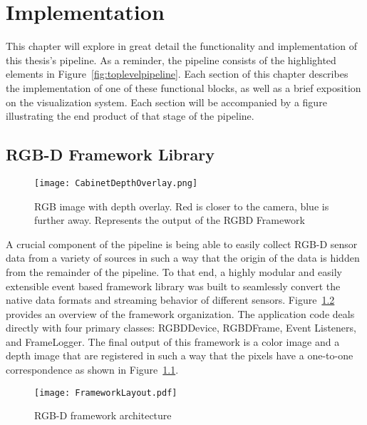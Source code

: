 \chapter{Implementation}
\label{chap:implementation}
This chapter will explore in great detail the functionality and implementation of this thesis's pipeline. As a reminder, the pipeline consists of the highlighted elements in Figure~\ref{fig:toplevelpipeline}. Each section of this chapter describes the implementation of one of these functional blocks, as well as a brief exposition on the visualization system. Each section will be accompanied by a figure illustrating the end product of that stage of the pipeline.

\section{RGB-D Framework Library}
\begin{figure}[ht]
    \centering
    \texttt{[image: CabinetDepthOverlay.png]}
    \caption{RGB image with depth overlay. Red is closer to the camera, blue is further away. Represents the output of the RGBD Framework}
    \label{fig:rgbdframeworkoutput}
\end{figure}
A crucial component of the pipeline is being able to easily collect RGB-D sensor data from a variety of sources in such a way that the origin of the data is hidden from the remainder of the pipeline. To that end, a highly modular and easily extensible event based framework library was built to seamlessly convert the native data formats and streaming behavior of different sensors. Figure~\ref{fig:rgbdframework} provides an overview of the framework organization. The application code deals directly with four primary classes: RGBDDevice, RGBDFrame, Event Listeners, and FrameLogger. The final output of this framework is a color image and a depth image that are registered in such a way that the pixels have a one-to-one correspondence as shown in Figure~\ref{fig:rgbdframeworkoutput}.
\begin{figure}[ht]
    \centering
    \texttt{[image: FrameworkLayout.pdf]}
    \caption{RGB-D framework architecture}
    \label{fig:rgbdframework}
\end{figure}
